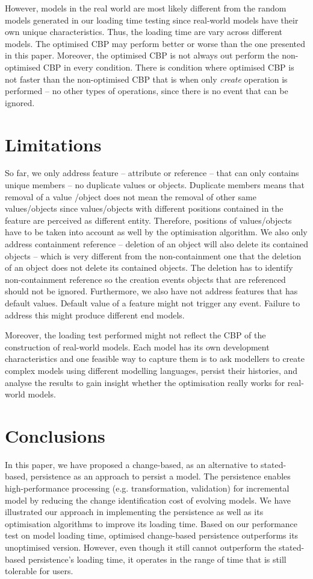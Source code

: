 \documentclass{llncs}
\begin{document}
{However, models in the real world are most likely different from the random models generated in our loading time testing since real-world models have their own unique characteristics. Thus, the loading time are vary across different models. The optimised CBP may perform better or worse than the one presented in this paper. Moreover, the optimised CBP is not always out perform the non-optimised CBP in every condition. There is condition where optimised CBP is not faster than the non-optimised CBP that is when only \emph{create} operation is performed -- no other types of operations, since there is no event that can be ignored. 

\section{Limitations}
\label{sec:limitations}
So far, we only address feature -- attribute or reference -- that can only contains unique members -- no duplicate values or objects. Duplicate members means that removal of a value /object does not mean the removal of other same values/objects since values/objects with different positions contained in the feature are perceived as different entity. Therefore, positions of values/objects have to be taken into account as well by the optimisation algorithm. We also only address containment reference -- deletion of an object will also delete its contained objects -- which is very different from the non-containment one that the deletion of an object does not delete its contained objects. The deletion has to identify non-containment reference so the creation events objects that are referenced should not be ignored. Furthermore, we also have not address features that has default values. Default value of a feature might not trigger any event. Failure to address this might produce different end models. 

Moreover, the loading test performed might not reflect the CBP of the construction of real-world models. Each model has its own development characteristics and one feasible way to capture them is to ask modellers to create complex models using different modelling languages, persist their histories, and analyse the results to gain insight whether the optimisation really works for real-world models. 

\section{Conclusions}
\label{sec:conclusions}
In this paper, we have proposed a change-based, as an alternative to stated-based, persistence as an approach to persist a model. The persistence enables high-performance processing (e.g. transformation, validation) for incremental model by reducing the change identification cost of evolving models. We have illustrated our approach in implementing the persistence as well as its optimisation algorithms to improve its loading time. Based on our performance test on model loading time, optimised change-based persistence outperforms its unoptimised version. However, even though it still cannot outperform the stated-based persistence's loading time, it operates in the range of time that is still tolerable for users. 

}
\end{document}

